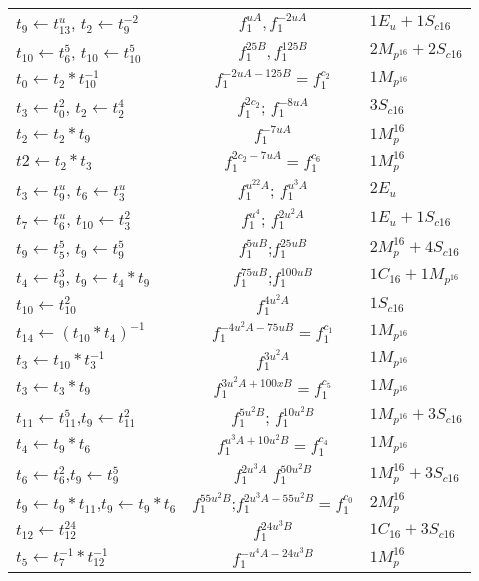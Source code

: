 \begin{center}
\begin{table}[!ht]
{\begin{tabular}{l|c|l}
			\hline
			$t_9 \leftarrow t_{13}^{u}$, $t_2 \leftarrow t_9^{-2}$& $f_1^{uA}, f_1^{-2uA}$&$1E_u+1S_{c16}$\\
			$t_{10} \leftarrow t_6^5$, 	$t_{10} \leftarrow t_{10}^5$&$ f_1^{25B}, f_1^{125B}$&$2M_{p^{16}}+2S_{c16}$\\
			$t_{0} \leftarrow t_2*t_{10}^{-1}$&$f_1^{-2uA-125B}=f_1^{c_2}$&$1M_{p^{16}}$\\
			\hline
			$t_{3} \leftarrow t_0^2$, 	$t_2 \leftarrow t_2^4$ & $f_1^{2c_2}$; $f_1^{-8uA}$ & $3S_{c16}$\\
			$t_2 \leftarrow t_2*t_9$ & $f_1^{-7uA}$& $1M_p^{16}$\\
			$t2 \leftarrow t_2*t_3$& $f_1^{2c_2-7uA} = f_1^{c_6}$& $1M_p^{16}$ \\
			$t_3 \leftarrow t_9^{u}$, $t_6 \leftarrow t_3^{u}$ & $f_1^{u^22A}$; $f_1^{u^3A}$ & $2E_u$\\
			$t_7 \leftarrow t_6^{u}$, $t_{10} \leftarrow t_3^{2}$&$f_1^{u^4}$; $f_1^{2u^2A}$& $1E_u + 1S_{c16}$\\
			\hline
			$t_{9} \leftarrow t_5^5$, $t_{9} \leftarrow t_9^5$&$f_1^{5uB}$;$f_1^{25uB}$&$2M_p^{16}+4S_{c16}$\\
			$t_{4} \leftarrow t_9^3$, $t_{9} \leftarrow t_4*t_9$&$f_1^{75uB}$;$f_1^{100uB}$& $1C_{16}+1M_{p^{16}}$\\
			$t_{10} \leftarrow t_{10}^2$& $f_1^{4u^2A}$&$1S_{c16}$\\
			$t_{14} \leftarrow (t_{10}*t_4)^{-1}$ & $f_1^{-4u^2A-75uB}=f_1^{c_1}$ & $1M_{p^{16}}$\\
			$t_{3} \leftarrow t_{10}*t_3^{-1}$& $f_1^{3u^2A}$&$1M_{p^{16}}$\\
			$t_{3} \leftarrow t_3*t_9$ & $f_1^{3u^2A+100xB}=f_1^{c_5}$ & $1M_{p^{16}}$\\
			$t_{11} \leftarrow t_{11}^5$,$t_{9} \leftarrow t_{11}^2$ & $f_1^{5u^2B}$; $f_1^{10u^2B}$ & $1M_{p^{16}} + 3S_{c16}$ \\
			$t_{4} \leftarrow t_{9}*t_{6}$& $f_1^{u^3A+10u^2B}=f_1^{c_4}$ &$1M_{p^{16}}$\\
			\hline
			$t_{6} \leftarrow t_{6}^2$,$t_{9} \leftarrow t_9^5$& $f_1^{2u^3A}$ $f_1^{50u^2B}$ &$1M_p^{16}+3S_{c16}$\\
			$t_{9} \leftarrow t_{9}*t_{11}$,$t_{9} \leftarrow t_{9}*t_{6}$&$f_1^{55u^2B}$;$f_1^{2u^3A-55u^2B}=f_1^{c_0}$&$2M_p^{16}$\\
			$t_{12} \leftarrow t_{12}^{24}$&$f_1^{24u^3B}$& $1C_{16}+3S_{c16}$\\
			$t_{5} \leftarrow t_{7}^{-1}*t_{12}^{-1}$& $f_1^{-u^4A-24u^3B}$& $1M_p^{16}$\\

\end{tabular}}
\end{table}
\end{center}

